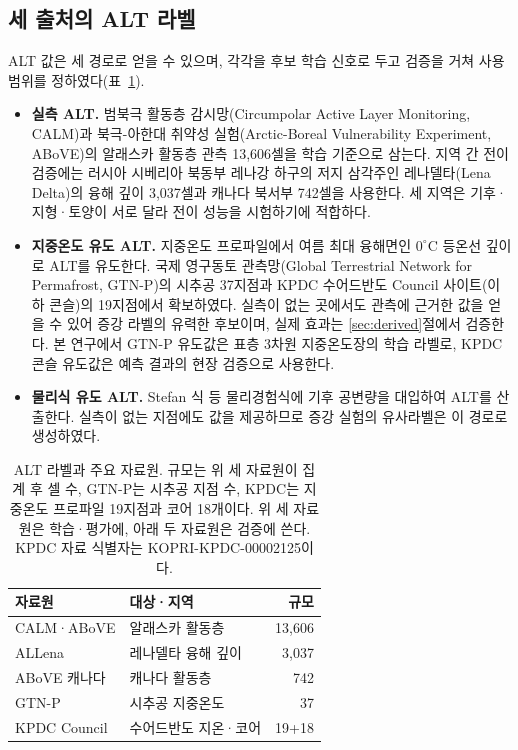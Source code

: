 \documentclass[10pt,twocolumn]{article}
\newcommand{\tabhead}[1]{\textbf{#1}}
\begin{document}
\subsection{세 출처의 ALT 라벨}
ALT 값은 세 경로로 얻을 수 있으며, 각각을 후보 학습 신호로 두고 검증을 거쳐 사용 범위를 정하였다(표~\ref{tab:data}).
\begin{itemize}[leftmargin=1.1em,itemsep=1pt,topsep=2pt]
\item \textbf{실측 ALT.} 범북극 활동층 감시망(Circumpolar Active Layer Monitoring, CALM)과 북극-아한대 취약성 실험(Arctic-Boreal Vulnerability Experiment, ABoVE)의 알래스카 활동층 관측 13{,}606셀을 학습 기준으로 삼는다. 지역 간 전이 검증에는 러시아 시베리아 북동부 레나강 하구의 저지 삼각주인 레나델타(Lena Delta)의 융해 깊이 3{,}037셀과 캐나다 북서부 742셀을 사용한다. 세 지역은 기후·지형·토양이 서로 달라 전이 성능을 시험하기에 적합하다.
\item \textbf{지중온도 유도 ALT.} 지중온도 프로파일에서 여름 최대 융해면인 $0^\circ\mathrm{C}$ 등온선 깊이로 ALT를 유도한다. 국제 영구동토 관측망(Global Terrestrial Network for Permafrost, GTN-P)의 시추공 37지점과 KPDC 수어드반도 Council 사이트(이하 콘슬)의 19지점에서 확보하였다. 실측이 없는 곳에서도 관측에 근거한 값을 얻을 수 있어 증강 라벨의 유력한 후보이며, 실제 효과는 \ref{sec:derived}절에서 검증한다. 본 연구에서 GTN-P 유도값은 표층 3차원 지중온도장의 학습 라벨로, KPDC 콘슬 유도값은 예측 결과의 현장 검증으로 사용한다.
\item \textbf{물리식 유도 ALT.} Stefan 식 등 물리경험식에 기후 공변량을 대입하여 ALT를 산출한다. 실측이 없는 지점에도 값을 제공하므로 증강 실험의 유사라벨은 이 경로로 생성하였다.
\end{itemize}

\begin{table}[H]
\centering
\footnotesize
\caption{ALT 라벨과 주요 자료원. 규모는 위 세 자료원이 집계 후 셀 수, GTN-P는 시추공 지점 수, KPDC는 지중온도 프로파일 19지점과 코어 18개이다. 위 세 자료원은 학습·평가에, 아래 두 자료원은 검증에 쓴다. KPDC 자료 식별자는 KOPRI-KPDC-00002125이다.}
\label{tab:data}
\begin{tabular}{@{}llr@{}}
\toprule
\tabhead{자료원} & \tabhead{대상·지역} & \tabhead{규모} \\
\midrule
CALM·ABoVE & 알래스카 활동층 & 13{,}606 \\
ALLena & 레나델타 융해 깊이 & 3{,}037 \\
ABoVE 캐나다 & 캐나다 활동층 & 742 \\
GTN-P & 시추공 지중온도 & 37 \\
KPDC Council & 수어드반도 지온·코어 & 19+18 \\
\bottomrule
\end{tabular}
\end{table}
\end{document}
